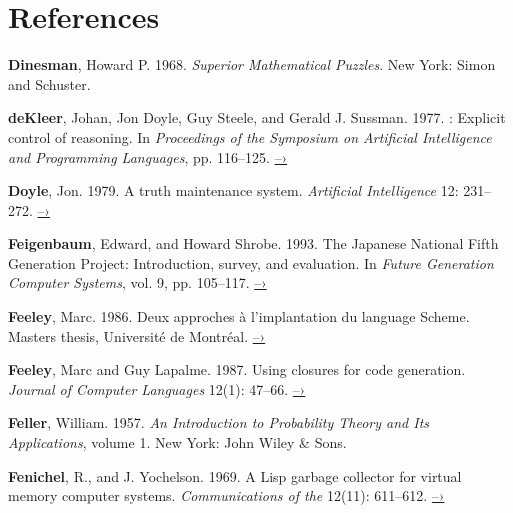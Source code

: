 \chapter*{References}
\label{References}


 \label{Dinesman 1968}
\textbf{Dinesman}, Howard P.  1968.  \textit{Superior Mathematical Puzzles}.  New York:
Simon and Schuster.

 \label{deKleer et al. 1977}
\textbf{deKleer}, Johan, Jon Doyle, Guy Steele, and Gerald J. Sussman.  1977.
: Explicit control of reasoning.  In \textit{Proceedings of the
 Symposium on Artificial Intelligence and Programming Languages},
pp.  116--125.
\href{http://dspace.mit.edu/handle/1721.1/5750}{–›}

 \label{Doyle (1979)}
\textbf{Doyle}, Jon. 1979. A truth maintenance system. \textit{Artificial Intelligence}
12: 231--272.
\href{http://dspace.mit.edu/handle/1721.1/5733}{–›}

 \label{Feigenbaum and Shrobe 1993}
\textbf{Feigenbaum}, Edward, and Howard Shrobe. 1993. The Japanese National Fifth
Generation Project: Introduction, survey, and evaluation.  In \textit{Future
Generation Computer Systems}, vol. 9, pp. 105--117.
\href{https://saltworks.stanford.edu/assets/kv359wz9060.pdf}{–›}

 \label{Feeley (1986)}
\textbf{Feeley}, Marc.  1986.  Deux approches \`a l'implantation du language
Scheme.  Masters thesis, Universit\'e de Montr\'eal.
\href{http://www.iro.umontreal.ca/~feeley/papers/FeeleyMSc.pdf}{–›}

 \label{Feeley and Lapalme 1987}
\textbf{Feeley}, Marc and Guy Lapalme.  1987.  Using closures for code generation.
\textit{Journal of Computer Languages} 12(1): 47--66.
\href{http://citeseerx.ist.psu.edu/viewdoc/summary?doi=10.1.1.90.6978}{–›}

\textbf{Feller}, William.  1957.  \textit{An Introduction to Probability Theory and Its
Applications}, volume 1. New York: John Wiley \& Sons.

 \label{Fenichel and Yochelson (1969)}
\textbf{Fenichel}, R., and J. Yochelson.  1969.  A Lisp garbage collector for virtual
memory computer systems.  \textit{Communications of the }
12(11): 611--612.
\href{https://www.cs.purdue.edu/homes/hosking/690M/p611-fenichel.pdf}{–›}


